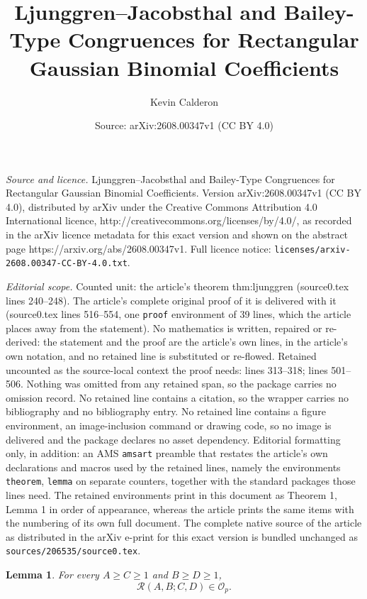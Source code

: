\documentclass[10pt,a4paper]{amsart}
\title{Ljunggren--Jacobsthal and Bailey-Type Congruences for Rectangular Gaussian Binomial Coefficients}
\author{Kevin Calderon}
\date{Source: arXiv:2608.00347v1 (CC BY 4.0)}
\newtheorem{lemma}{Lemma}
\newcommand{\Op}{\mathcal O_p}
\newcommand{\Rect}{\mathcal R}
\begin{document}
\maketitle

\noindent\emph{Source and licence.} Ljunggren--Jacobsthal and Bailey-Type Congruences for Rectangular Gaussian Binomial Coefficients. Version arXiv:2608.00347v1 (CC BY 4.0), distributed by arXiv under the Creative Commons Attribution 4.0 International licence, http://creativecommons.org/licenses/by/4.0/, as recorded in the arXiv licence metadata for this exact version and shown on the abstract page https://arxiv.org/abs/2608.00347v1. Full licence notice: \texttt{licenses/arxiv-2608.00347-CC-BY-4.0.txt}.\par\smallskip

\noindent\textit{Editorial scope.} Counted unit: the article's theorem thm:ljunggren (source0.tex lines 240--248). The article's complete original proof of it is delivered with it (source0.tex lines 516--554, one \texttt{proof} environment of 39 lines, which the article places away from the statement). No mathematics is written, repaired or re-derived: the statement and the proof are the article's own lines, in the article's own notation, and no retained line is substituted or re-flowed.  Retained uncounted as the source-local context the proof needs: lines 313--318; lines 501--506.  Nothing was omitted from any retained span, so the package carries no omission record.  No retained line contains a citation, so the wrapper carries no bibliography and no bibliography entry.  No retained line contains a figure environment, an image-inclusion command or drawing code, so no image is delivered and the package declares no asset dependency.  Editorial formatting only, in addition: an AMS \texttt{amsart} preamble that restates the article's own declarations and macros used by the retained lines, namely the environments \texttt{theorem}, \texttt{lemma} on separate counters, together with the standard packages those lines need.  The retained environments print in this document as Theorem 1, Lemma 1 in order of appearance, whereas the article prints the same items with the numbering of its own full document.  The complete native source of the article as distributed in the arXiv e-print for this exact version is bundled unchanged as \texttt{sources/206535/source0.tex}.
\begin{lemma}\label{lem:integrality}
For every $A\geq C\geq 1$ and $B\geq D\geq 1$,
\[
\Rect(A,B;C,D)\in\Op.
\]
\end{lemma}
\end{document}
